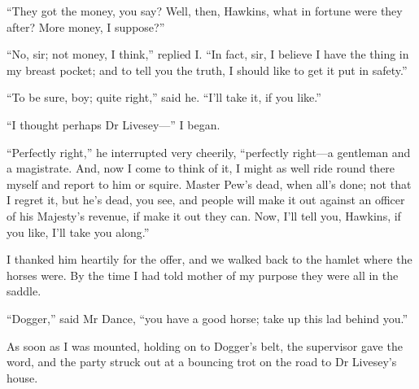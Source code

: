 \enquote{They got the money, you say? Well, then, Hawkins, what in fortune were they after? More money, I suppose?}

\enquote{No, sir; not money, I think,} replied I. \enquote{In fact, sir, I believe I have the thing in my breast pocket; and to tell you the truth, I should like to get it put in safety.}

\enquote{To be sure, boy; quite right,} said he. \enquote{I’ll take it, if you like.}

\enquote{I thought perhaps Dr Livesey---} I began.

\enquote{Perfectly right,} he interrupted very cheerily, \enquote{perfectly right---a gentleman and a magistrate. And, now I come to think of it, I might as well ride round there myself and report to him or squire. Master Pew’s dead, when all’s done; not that I regret it, but he’s dead, you see, and people will make it out against an officer of his Majesty’s revenue, if make it out they can. Now, I’ll tell you, Hawkins, if you like, I’ll take you along.}

I thanked him heartily for the offer, and we walked back to the hamlet where the horses were. By the time I had told mother of my purpose they were all in the saddle.

\enquote{Dogger,} said Mr Dance, \enquote{you have a good horse; take up this lad behind you.}

As soon as I was mounted, holding on to Dogger’s belt, the supervisor gave the word, and the party struck out at a bouncing trot on the road to Dr Livesey’s house.